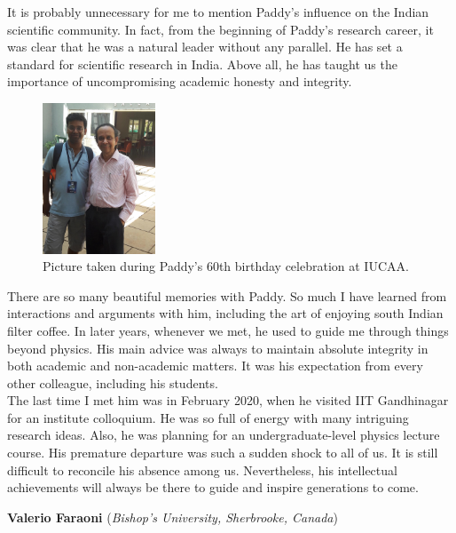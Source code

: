 \documentclass[prd, preprint, longbibliography, 12pt]{revtex4-2}
\begin{document}
It is probably unnecessary for me to mention Paddy's influence on the Indian scientific community. In fact, from the beginning of Paddy's research career, it was clear that he was a natural leader without any parallel. He has set a standard for scientific research in India. Above all, he has taught us the importance of uncompromising academic honesty and integrity.


\begin{figure}[H]
\centering
\includegraphics[width=0.3\textwidth]{with_paddy.jpeg}
\caption* {Picture taken during Paddy's 60th birthday celebration at IUCAA.}
\end{figure}


There are so many beautiful memories with Paddy. So much I have learned from interactions and arguments with him, including the art of enjoying south Indian filter coffee. In later years, whenever we met, he used to guide me through things beyond physics. His main advice was always to maintain absolute integrity in both academic and non-academic matters. It was his expectation from every other colleague, including his students. \\

The last time I met him was in February 2020, when he visited IIT Gandhinagar for an institute colloquium. He was so full of energy with many intriguing research ideas. Also, he was planning for an undergraduate-level physics lecture course. His premature departure was such a sudden shock to all of us. It is still difficult to reconcile his absence among us. Nevertheless, his intellectual achievements will always be there to guide and inspire generations to come.




\bigskip

\bigskip


\centerline{{\bf Valerio Faraoni} ({\it Bishop's University, Sherbrooke, Canada})}
\medskip
\noindent 
\end{document}
